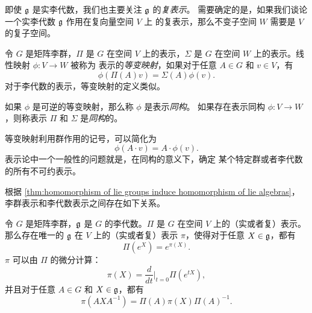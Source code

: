 即使 $\mathfrak{g}$ 是实李代数，我们也主要关注 $\mathfrak{g}$ 的\emph{复表示}。
需要确定的是，如果我们谈论一个实李代数 $\mathfrak{g}$ 作用在复向量空间 $V$ 上
的复表示，那么不变子空间 $W$ 需要是 $V$ 的复子空间。

\begin{definition}
  令 $G$ 是矩阵李群，$\Pi$ 是 $G$ 在空间 $V$ 上的表示，$\Sigma$
  是 $G$ 在空间 $W$ 上的表示。线性映射 $\phi:V\to W$ 被称为
  表示的\emph{等变映射}，如果对于任意 $A\in G$ 和 $v\in V$，有
  \[
    \phi(\Pi(A)v)=\Sigma(A)\phi(v).
  \]
  对于李代数的表示，等变映射的定义类似。
\end{definition}

如果 $\phi$ 是可逆的等变映射，那么称 $\phi$ 是表示\emph{同构}。
如果存在表示同构 $\phi:V\to W$，则称表示 $\Pi$ 和 $\Sigma$ 是\emph{同构}的。

等变映射利用群作用的记号，可以简化为
\[
  \phi(A\cdot v)=A\cdot \phi(v).
\]
表示论中一个一般性的问题就是，在同构的意义下，确定
某个特定群或者李代数的所有不可约表示。

根据 \autoref{thm:homomorphism of lie groups induce homomorphism of lie algebras}，
李群表示和李代数表示之间存在如下关系。

\begin{proposition}
  令 $G$ 是矩阵李群，$\mathfrak{g}$ 是 $G$ 的李代数。$\Pi$ 是 $G$ 在空间 $V$ 上的（实或者复）表示。
  那么存在唯一的 $\mathfrak{g}$ 在 $V$ 上的（实或者复）表示 $\pi$，使得对于任意 $X\in \mathfrak{g}$，都有
  \[
    \Pi(e^X)=e^{\pi(X)}.
  \]
  $\pi$ 可以由 $\Pi$ 的微分计算：
  \[
    \pi(X)=\frac{d}{dt}\bigg|_{t=0} \Pi(e^{tX}),
  \]
  并且对于任意 $A\in G$ 和 $X\in \mathfrak{g}$，都有
  \[
    \pi(AXA^{-1})=\Pi(A)\pi(X)\Pi(A)^{-1}.
  \]
\end{proposition}

